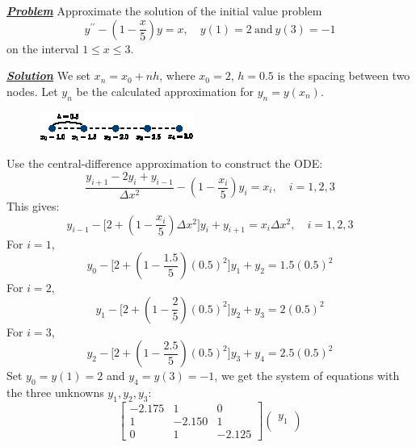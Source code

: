 \documentclass[10pt, a4paper]{article}
\begin{document}

\begin{tcolorbox}[title = \textbf{\huge Example}]
{\large\textbf{\textit{\underline{Problem}}}}\newline \newline
Approximate the solution of the initial value problem
    \[y^{\prime\prime} - (1-\frac{x}{5})y=x, 
    \quad y(1)=2 \ \text{and} \ y(3)=-1
    \]
on the interval $\displaystyle 1 \leq x\leq 3$.\newline \newline

{\large\textbf{\textit{\underline{Solution}}}}\newline \newline
We set $x_{n} = x_{0}+nh$, where $x_{0}=2$, $h=0.5$ is the spacing between two nodes. Let $y_{n}$ be the calculated approximation for $y_{n} = y(x_{n})$.
\begin{figure}[H]
    \centering
    \includegraphics[width=.6\textwidth]{imgs/FD-example.eps}
\end{figure}
\noindent Use the central-difference approximation to construct the ODE:
    \[
    \frac{y_{i+1}-2y_{i}+y_{i-1}}{\Delta x^{2}} - (1-\frac{x_{i}}{5})y_{i} = x_{i}, \quad i=1, 2, 3
    \]
This gives:
    \[
    y_{i-1} - \bigg[ 2+(1-\frac{x_{i}}{5})\Delta x^{2} \bigg]y_{i} +y_{i+1} = x_{i}\Delta x^{2}, \quad i=1, 2, 3
    \]
For $i=1$, 
    \[
    y_{0} - \bigg[ 2+(1-\frac{1.5}{5})(0.5)^{2} \bigg]y_{1} + y_{2} = 1.5(0.5)^{2}
    \]
For $i=2$, 
    \[
    y_{1} - \bigg[ 2+(1-\frac{2}{5})(0.5)^{2} \bigg]y_{2} + y_{3} = 2(0.5)^{2}
    \]
For $i=3$, 
    \[
    y_{2} - \bigg[ 2+(1-\frac{2.5}{5})(0.5)^{2} \bigg]y_{3} + y_{4} = 2.5(0.5)^{2}
    \]
Set $y_{0} = y(1) = 2$ and $y_{4} = y(3) = -1$, we get the system of equations with the three unknowns $y_{1}, y_{2}, y_{3}$:
    \[
    \begin{bmatrix}
    -2.175  &   1   &   0\\
    1   &   -2.150  &   1\\
    0   &   1   &   -2.125
    \end{bmatrix}
    \begin{pmatrix}
    y_{1} \\

\end{pmatrix}\]
\end{tcolorbox}
\end{document}
